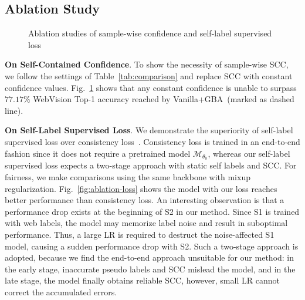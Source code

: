 \documentclass[runningheads]{llncs}
\begin{document}
\subsection{Ablation Study}
\label{S:exp-ablation}


\begin{figure}[b]
\centering
{}
\hfill
{}
	\caption{Ablation studies of sample-wise confidence and self-label supervised loss}
\label{fig:ablation}
\end{figure}

\textbf{On Self-Contained Confidence}.
To show the necessity of sample-wise SCC, we follow the settings of Table~\ref{tab:comparison} and replace SCC with constant confidence values.
Fig.~\ref{fig:ablation} shows that any constant confidence is unable to surpass $77.17\%$ WebVision Top-1 accuracy reached by Vanilla+GBA~(marked as dashed line).

\textbf{On Self-Label Supervised Loss}.
We demonstrate the superiority of self-label supervised loss over consistency loss~\cite{berthelot2019mixmatch,xie2019unsupervised}. 
Consistency loss is trained in an end-to-end fashion since it does not require a pretrained model $\mathcal{M}_{\theta_0}$, 
whereas our self-label supervised loss expects a two-stage approach with static self labels and SCC.
For fairness, we make comparisons using the same backbone with mixup regularization. Fig.~\ref{fig:ablation-loss} shows the model with our loss reaches better performance than consistency loss. An interesting observation is that a performance drop exists at the beginning of S2 in our method. 
Since S1 is trained with web labels, the model may memorize label noise and result in suboptimal performance. Thus, a large LR is required to destruct the noise-affected S1 model, causing a sudden performance drop with S2. Such a two-stage approach is adopted, because we find the end-to-end approach unsuitable for our method: in the early stage, inaccurate pseudo labels and SCC mislead the model, and in the late stage, the model finally obtains reliable SCC, however, small LR cannot correct the accumulated errors.
\end{document}
